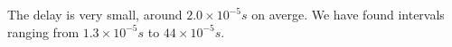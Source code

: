 The delay is very small, around $ 2.0 \times 10^{-5} s $ on averge. We have found intervals ranging from $ 1.3 \times 10^{-5} s $ to $ 44 \times 10^{-5} s $.